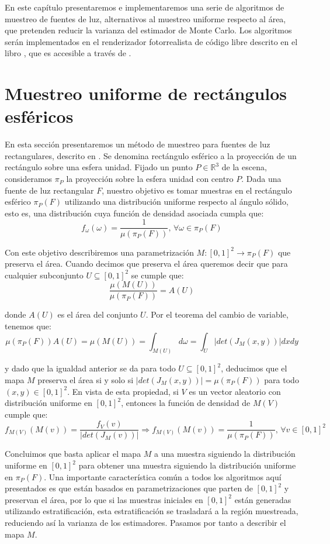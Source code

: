 En este capítulo presentaremos e implementaremos una serie de algoritmos de muestreo de fuentes de luz, alternativos al muestreo uniforme respecto al área, que pretenden reducir la varianza del estimador de Monte Carlo. Los algoritmos serán implementados en el renderizador fotorrealista de código libre descrito en el libro \cite{Pharr2016}, que es accesible a través de \cite{pbrtCode}.

\section{Muestreo uniforme de rectángulos esféricos}

En esta sección presentaremos un método de muestreo para fuentes de luz rectangulares, descrito en \cite{Urena2013}. Se denomina rectángulo esférico a la proyección de un rectángulo sobre una esfera unidad. Fijado un punto $P\in\mathds{R}^3$ de la escena, consideramos $\pi_P$ la proyección sobre la esfera unidad con centro $P$. Dada una fuente de luz rectangular $F$, nuestro objetivo es tomar muestras en el rectángulo esférico $\pi_P(F)$ utilizando una distribución uniforme respecto al ángulo sólido, esto es, una distribución cuya función de densidad asociada cumpla que:
$$f_{\omega}(\omega) = \frac{1}{\mu(\pi_P(F))}\text{, }\forall \omega\in\pi_P(F)$$

Con este objetivo describiremos una parametrización $M:[0,1]^2\rightarrow \pi_P(F)$ que preserva el área. Cuando decimos que preserva el área queremos decir que para cualquier subconjunto $U\subseteq [0,1]^2$ se cumple que:
$$\frac{\mu(M(U))}{\mu(\pi_P(F))} = A(U)$$

donde $A(U)$ es el área del conjunto $U$. Por el teorema del cambio de variable, tenemos que:
$$\mu(\pi_P(F))A(U) = \mu(M(U)) = \int_{M(U)}d\omega = \int_{U}|det(J_M(x,y))| dxdy $$

y dado que la igualdad anterior se da para todo $U\subseteq [0,1]^2$, deducimos que el mapa $M$ preserva el área si y solo si $|det(J_M(x,y))| = \mu(\pi_P(F))$ para todo $(x,y)\in[0,1]^2$. En vista de esta propiedad, si $V$ es un vector aleatorio con distribución uniforme en $[0,1]^2$, entonces la función de densidad de $M(V)$ cumple que:
$$f_{M(V)}(M(v)) = \frac{f_V(v)}{|det(J_M(v))|}\Rightarrow f_{M(V)}(M(v)) =\frac{1}{\mu(\pi_P(F))} \text{, }\forall v\in [0,1]^2$$

Concluimos que basta aplicar el mapa $M$ a una muestra siguiendo la distribución uniforme en $[0,1]^2$ para obtener una muestra siguiendo la distribución uniforme en $\pi_P(F)$.  Una importante característica común a todos los algoritmos aquí presentados es que están basados en parametrizaciones que parten de $[0,1]^2$ y preservan el área, por lo que si las muestras iniciales en $[0,1]^2$ están generadas utilizando estratificación, esta estratificación se trasladará a la región muestreada, reduciendo así la varianza de los estimadores. Pasamos por tanto a describir el mapa $M$.\\

